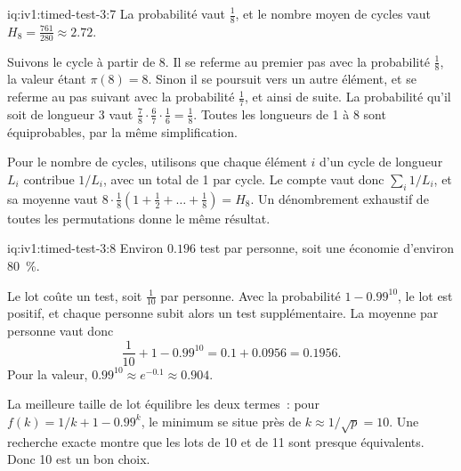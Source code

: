 \begin{solution}{iq:iv1:timed-test-3:7}
La probabilité vaut $\frac18$, et le nombre moyen de cycles vaut $H_8 = \frac{761}{280} \approx 2.72$.

Suivons le cycle à partir de 8. Il se referme au premier pas avec la probabilité $\frac18$, la valeur étant $\pi(8) = 8$. Sinon il se poursuit vers un autre élément, et se referme au pas suivant avec la probabilité $\frac17$, et ainsi de suite. La probabilité qu'il soit de longueur 3 vaut $\frac78 \cdot \frac67 \cdot \frac16 = \frac18$. Toutes les longueurs de 1 à 8 sont équiprobables, par la même simplification.

Pour le nombre de cycles, utilisons que chaque élément $i$ d'un cycle de longueur $L_i$ contribue $1/L_i$, avec un total de 1 par cycle. Le compte vaut donc $\sum_i1/L_i$, et sa moyenne vaut $8 \cdot \frac18(1 + \frac12 + \dots + \frac18) = H_8$. Un dénombrement exhaustif de toutes les permutations donne le même résultat.

\end{solution}

\begin{solution}{iq:iv1:timed-test-3:8}
Environ $0.196$ test par personne, soit une économie d'environ 80~\%.

Le lot coûte un test, soit $\frac{1}{10}$ par personne. Avec la probabilité $1 - 0.99^{10}$, le lot est positif, et chaque personne subit alors un test supplémentaire. La moyenne par personne vaut donc
\[
\frac{1}{10} + 1 - 0.99^{10} = 0.1 + 0.0956 = 0.1956.
\]
Pour la valeur, $0.99^{10} \approx e^{-0.1} \approx 0.904$.

La meilleure taille de lot équilibre les deux termes~: pour $f(k) = 1/k + 1 - 0.99^k$, le minimum se situe près de $k \approx 1/\sqrt{p} = 10$. Une recherche exacte montre que les lots de 10 et de 11 sont presque équivalents. Donc 10 est un bon choix.

\end{solution}

